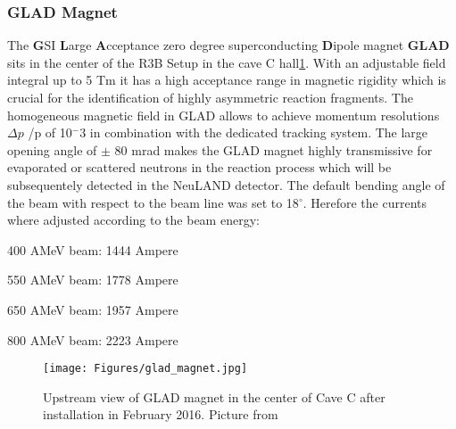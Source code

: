 \subsubsection{GLAD Magnet}
The \textbf{G}SI \textbf{L}arge \textbf{A}cceptance zero degree superconducting \textbf{D}ipole magnet \textbf{GLAD} sits in the center of the R3B Setup in the cave C hall\ref{fig:GLAD}. With an adjustable field integral up to 5 Tm it has a high acceptance range in magnetic rigidity which is crucial for the identification of highly asymmetric reaction fragments. The homogeneous magnetic field in GLAD allows to achieve momentum resolutions $\Delta p$ /p of 10$^-3$ in combination with the dedicated tracking system.\newline
The large opening angle of $\pm$ 80 mrad makes the GLAD magnet highly transmissive for evaporated or scattered neutrons in the reaction process which will be subsequentely detected in the NeuLAND detector.\newline
The default bending angle of the beam with respect to the beam line was set to 18$^{\circ}$. Herefore the currents where adjusted according to the beam energy:\newline
\newenvironment{tight_enumerate}{
\begin{enumerate}
  \setlength{\itemsep}{0pt}
  \setlength{\parskip}{0pt}
}{\end{enumerate}}
\begin{tight_enumerate}
\item 400 AMeV beam: 1444 Ampere
\item 550 AMeV beam: 1778 Ampere
\item 650 AMeV beam: 1957 Ampere
\item 800 AMeV beam: 2223 Ampere
\end{tight_enumerate}
\begin{figure}[htpb]
    \centering
    \texttt{[image: Figures/glad\_magnet.jpg]}
    \caption{
    Upstream view of GLAD magnet in the center of Cave C after installation in February 2016. Picture from \cite{wiki:GLAD} 
    }
    \label{fig:GLAD}
\end{figure}
